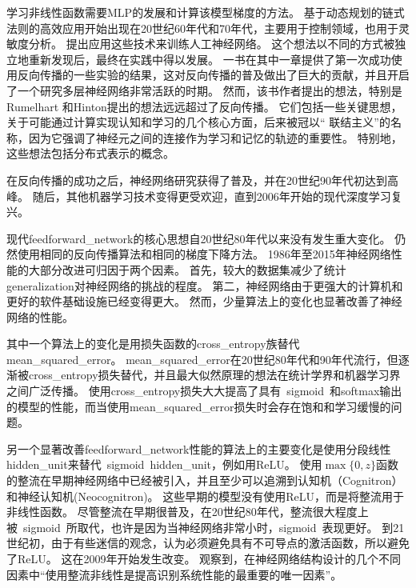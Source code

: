 学习非线性函数需要\gls{MLP}的发展和计算该模型梯度的方法。
基于动态规划的链式法则的高效应用开始出现在20世纪60年代和70年代，主要用于控制领域\citep{Kelley-1960,Bryson-Denham-1961,Dreyfus-1962,Bryson-Ho-1969,Dreyfus-1973}，也用于灵敏度分析\citep{Linnainmaa-1976}。 
\cite{Werbos-1981}提出应用这些技术来训练人工神经网络。
这个想法以不同的方式被独立地重新发现后\citep{LeCun-1985,Parker-1985,Rumelhart-et-al-1986a}，最终在实践中得以发展。
一书在其中一章提供了第一次成功使用反向传播的一些实验的结果\citep{Rumelhart-et-al-1986b}，这对反向传播的普及做出了巨大的贡献，并且开启了一个研究多层神经网络非常活跃的时期。
然而，该书作者提出的想法，特别是Rumelhart 和Hinton提出的想法远远超过了反向传播。
它们包括一些关键思想，关于可能通过计算实现认知和学习的几个核心方面，后来被冠以`` 联结主义''的名称，因为它强调了神经元之间的连接作为学习和记忆的轨迹的重要性。
特别地，这些想法包括分布式表示的概念\citep{Hinton-et-al-1986}。

在反向传播的成功之后，神经网络研究获得了普及，并在20世纪90年代初达到高峰。 
随后，其他机器学习技术变得更受欢迎，直到2006年开始的现代深度学习复兴。

现代\gls{feedforward_network}的核心思想自20世纪80年代以来没有发生重大变化。
仍然使用相同的反向传播算法和相同的梯度下降方法。
1986年至2015年神经网络性能的大部分改进可归因于两个因素。
首先，较大的数据集减少了统计\gls{generalization}对神经网络的挑战的程度。
第二，神经网络由于更强大的计算机和更好的软件基础设施已经变得更大。
然而，少量算法上的变化也显著改善了神经网络的性能。
  
  
其中一个算法上的变化是用损失函数的\gls{cross_entropy}族替代\gls{mean_squared_error}。
\gls{mean_squared_error}在20世纪80年代和90年代流行，但逐渐被\gls{cross_entropy}损失替代，并且最大似然原理的想法在统计学界和机器学习界之间广泛传播。
使用\gls{cross_entropy}损失大大提高了具有~\gls{sigmoid}~和softmax输出的模型的性能，而当使用\gls{mean_squared_error}损失时会存在饱和和学习缓慢的问题。

另一个显著改善\gls{feedforward_network}性能的算法上的主要变化是使用分段线性\gls{hidden_unit}来替代~\gls{sigmoid}~\gls{hidden_unit}，例如用\gls{ReLU}。
使用$\max\{0, z\}$函数的整流在早期神经网络中已经被引入，并且至少可以追溯到认知机（Cognitron）和神经认知机(Neocognitron)\citep{Fukushima-1975,Fukushima-1980}。
这些早期的模型没有使用\gls{ReLU}，而是将整流用于非线性函数。
尽管整流在早期很普及，在20世纪80年代，整流很大程度上被~\gls{sigmoid}~所取代，也许是因为当神经网络非常小时，\gls{sigmoid}~表现更好。
到21世纪初，由于有些迷信的观念，认为必须避免具有不可导点的激活函数，所以避免了\gls{ReLU}。
这在2009年开始发生改变。
\cite{Jarrett-et-al-2009}观察到，在神经网络结构设计的几个不同因素中``使用整流非线性是提高识别系统性能的最重要的唯一因素''。

